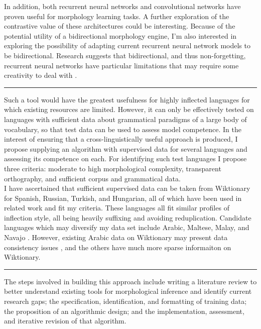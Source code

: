\documentclass[12pt]{report}
\begin{document}
In addition, both recurrent neural networks \cite{Cotterell2016} \cite{WolfSonkin2018} and convolutional networks \cite{Soricut2015} have proven useful for morphology learning tasks. A further exploration of the contrastive value of these architectures could be interesting. Because of the potential utility of a bidirectional morphology engine, I'm also interested in exploring the possibility of adapting current recurrent neural network models to be bidirectional. Research suggests that bidirectional, and thus non-forgetting, recurrent neural networks have particular limitations that may require some creativity to deal with \cite{MacKay2018}. \\

\hrule
\vspace{25pt}

Such a tool would have the greatest usefulness for highly inflected languages for which existing resources are limited. However, it can only be effectively tested on languages with sufficient data about grammatical paradigms of a large body of vocabulary, so that test data can be used to assess model competence. In the interest of ensuring that a cross-linguistically useful approach is produced, I propose supplying an algorithm with supervised data for several languages and assessing its competence on each. For identifying such test languages I propose three criteria: moderate to high morphological complexity, transparent orthography, and sufficient corpus and grammatical data. \\

I have ascertained that sufficient supervised data can be taken from Wiktionary for Spanish, Russian, Turkish, and Hungarian, all of which have been used in related work \cite{Cotterell2016} and fit my criteria. These languages all fit similar profiles of inflection style, all being heavily suffixing and avoiding reduplication. Candidate languages which may diversify my data set include Arabic, Maltese, Malay, and Navajo \cite{Cotterell2016}. However, existing Arabic data on Wiktionary may present data consistency issues \cite{Cotterell2016}, and the others have much more sparse informaiton on Wiktionary. \\

\hrule
\vspace{25pt}

The steps involved in building this approach include writing a literature review to better understand existing tools for morphological inference and identify current research gaps; the specification, identification, and formatting of training data; the proposition of an algorithmic design; and the implementation, assessment, and iterative revision of that algorithm. \\
\end{document}
